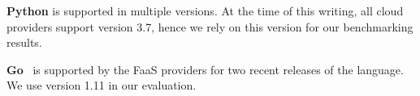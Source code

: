 
\textbf{Python} is supported in multiple versions. %
At the time of this writing, all cloud providers support version 3.7, hence we rely on this version for our benchmarking results.



\textbf{Go}~\cite{GoProject,GoProject}   is supported by the FaaS providers for two recent releases of the language.
We use version 1.11 in our evaluation.

